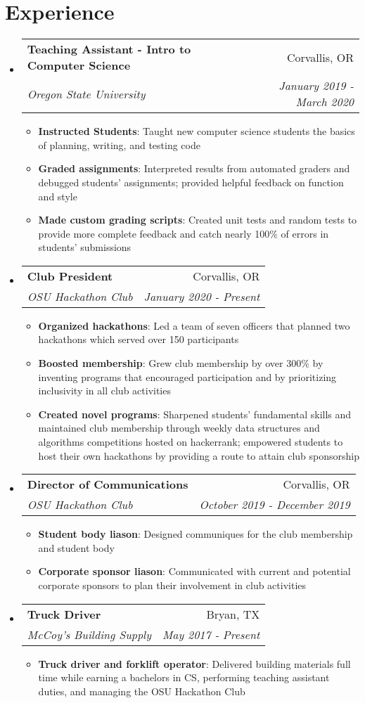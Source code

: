 \documentclass[letterpaper,11pt]{article}
\makeatletter
\newcommand{\resumeItem}[2]{
  \item \small{
    \textbf{#1}{: #2 \vspace{-2pt}}
  }
}
\newcommand{\resumeSubheading}[4]{
  \vspace{-1pt}\item
    \begin{tabular*}{0.97\textwidth}[t]{l@{\extracolsep{\fill}}r}
      \textbf{#1} & #2 \\
      \textit{\small#3} & \textit{\small #4} \\
    \end{tabular*}\vspace{-5pt}
}
\newcommand{\resumeSubHeadingListStart}{\begin{itemize}[label=, leftmargin=*]}
\newcommand{\resumeSubHeadingListEnd}{\end{itemize}}
\newcommand{\resumeItemListStart}{\begin{itemize}[label=$\cdot$]}
\newcommand{\resumeItemListEnd}{\end{itemize}\vspace{-5pt}}
\makeatother
\begin{document}
\section{Experience}
  \resumeSubHeadingListStart
	\resumeSubheading{Teaching Assistant - Intro to Computer Science}{Corvallis, OR}
	                 {Oregon State University}{January 2019 - March 2020}
      \resumeItemListStart
        \resumeItem{Instructed Students}{Taught new computer science students the basics of planning, writing, and testing code}
       	\resumeItem{Graded assignments}{Interpreted results from automated graders and debugged students' assignments; provided helpful feedback on function and style}
       	\resumeItem{Made custom grading scripts}{Created unit tests and random tests to provide more complete feedback and catch nearly 100\% of errors in students' submissions}
      \resumeItemListEnd
    \resumeSubheading{Club President}{Corvallis, OR}
                     {OSU Hackathon Club}{January 2020 - Present}
       \resumeItemListStart
         \resumeItem{Organized hackathons}{Led a team of seven officers that planned two hackathons which served over 150 participants}
         \resumeItem{Boosted membership}{Grew club membership by over 300\% by inventing programs that encouraged participation and by prioritizing inclusivity in all club activities}
         \resumeItem{Created novel programs}{Sharpened students' fundamental skills and maintained club membership through weekly data structures and algorithms competitions hosted on hackerrank; empowered students to host their own hackathons by providing a route to attain club sponsorship}
       \resumeItemListEnd
     \resumeSubheading{Director of Communications}{Corvallis, OR}
                      {OSU Hackathon Club}{October 2019 - December 2019}
        \resumeItemListStart
          \resumeItem{Student body liason}{Designed communiques for the club membership and student body}
          \resumeItem{Corporate sponsor liason}{Communicated with current and potential corporate sponsors to plan their involvement in club activities}
        \resumeItemListEnd
         \resumeSubheading{Truck Driver}{Bryan, TX}
                          {McCoy's Building Supply}{May 2017 - Present}
      \resumeItemListStart
      		\resumeItem{Truck driver and forklift operator}{Delivered building materials full time while earning a bachelors in CS, performing teaching assistant duties, and managing the OSU Hackathon Club}
      \resumeItemListEnd
  \resumeSubHeadingListEnd
\hfill

\end{document}
